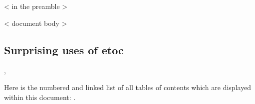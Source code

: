    < in the preamble >
\renewcommand{\etocaftertitlehook}
   {\stepcounter{visibletoc}\etoctoccontentsline{visibletoc}{\thevisibletoc}}

   < document body >
\subsection{Surprising uses of etoc}
\begingroup
    \etocinline
        {\etocskipfirstprefix}{, }{{\color{niceone}\etocname}}{}
    \etocsettocstyle{}{}     %

Here is the numbered and linked list of all tables of contents which are
displayed within this document: \tableofcontents.
\endgroup
